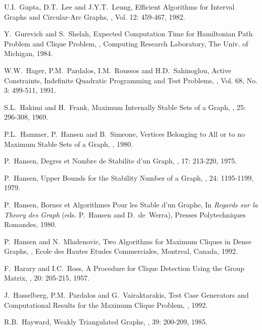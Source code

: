 \begin{thebibliography}{10}
U.I.~Gupta, D.T.~Lee and J.Y.T.~Leung,
\newblock Efficient Algorithms for Interval Graphs and Circular-Arc
Graphs,
, Vol. 12: 459-467, 1982.

Y.~Gurevich and S.~Shelah,
\newblock Expected Computation Time for Hamiltonian Path Problem and
Clique Problem,
, Computing Research Laboratory, The
Univ. of Michigan, 1984.

W.W.~Hager, P.M.~Pardalos, I.M.~Roussos and H.D.~Sahinoglou,
\newblock Active Constraints, Indefinite Quadratic Programming and
Test Problems, 
,
Vol. 68, No. 3: 499-511, 1991.

S.L.~Hakimi and H.~Frank,
\newblock Maximum Internally Stable Sets of a Graph,
, 25: 296-308, 1969.

P.L.~Hammer, P.~Hansen and B.~Simeone,
\newblock Vertices Belonging to All or to no Maximum Stable Sets of
a Graph,
, 1980.

P.~Hansen,
\newblock Degres et Nombre de Stabilite d'un Graph,
, 17: 213-220, 1975.

P.~Hansen,
\newblock Upper Bounds for the Stability Number of a Graph,
, 24:
1195-1199, 1979.

P.~Hansen,
\newblock Bornes et Algorithmes Pour les Stable d'un Graphe,
\newblock In {\em Regards sur la Theory des Graph} (eds. P.~Hansen
and D.~de~Werra), Presses Polytechniques Romandes, 1980.

P.~Hansen and N.~Mladenovic,
\newblock Two Algorithms for Maximum Cliques in Dense Graphs,
, Ecole des Hautes Etudes
Commerciales, Montreal, Canada, 1992.

F.~Harary and I.C.~Ross,
\newblock A Procedure for Clique Detection Using the Group Matrix,
, 20: 205-215, 1957.

J.~Hasselberg, P.M.~Pardalos and G.~Vairaktarakis,
\newblock Test Case Generators and Computational Results for the
Maximum Clique Problem,
, 1992.

R.B.~Hayward,
\newblock Weakly Triangulated Graphs,
, 39: 200-209, 1985.


\end{thebibliography}
